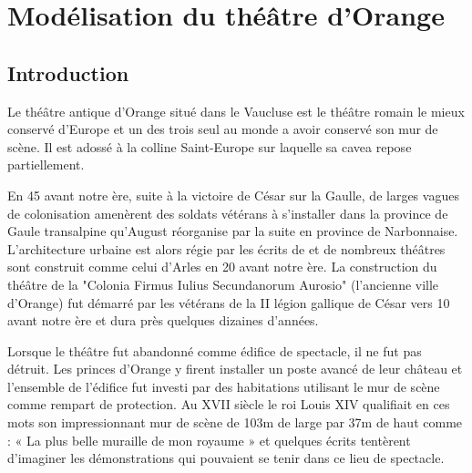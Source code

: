 \part{Modélisation du théâtre d’Orange}

	\chapter*{Introduction}
	
			 Le théâtre antique d'Orange situé dans le Vaucluse est le théâtre romain le mieux conservé d'Europe et un des trois seul au monde a avoir conservé son mur de scène. Il est adossé à la colline Saint-Europe sur laquelle sa \gls{cavea} repose partiellement.
			 
			 En 45 avant notre ère, suite à la victoire de César sur la Gaulle, de larges vagues de colonisation amenèrent des soldats vétérans à s'installer dans la province de Gaule transalpine qu'August réorganise par la suite en province de Narbonnaise. L'architecture urbaine est alors régie par les écrits de \cite{vitruve} et de nombreux théâtres sont construit comme celui d'Arles en 20 avant notre ère. La construction du théâtre de la "Colonia Firmus Iulius Secundanorum Aurosio" (l'ancienne ville d'Orange) fut démarré par les vétérans de la II légion gallique de César vers 10 avant notre ère et dura près quelques dizaines d'années. \citep{PouvoirDuTheatre}
			 
			 Lorsque le théâtre fut abandonné comme édifice de spectacle, il ne fut pas détruit. Les princes d'Orange y firent installer un poste avancé de leur château et l’ensemble de l’édifice fut investi par des habitations utilisant le mur de scène comme rempart de protection. Au XVII siècle le roi Louis XIV qualifiait en ces mots son impressionnant mur de scène de 103m de large par 37m de haut comme : « La plus belle muraille de mon royaume » et quelques écrits tentèrent d'imaginer les démonstrations qui pouvaient se tenir dans ce lieu de spectacle. 
			 
